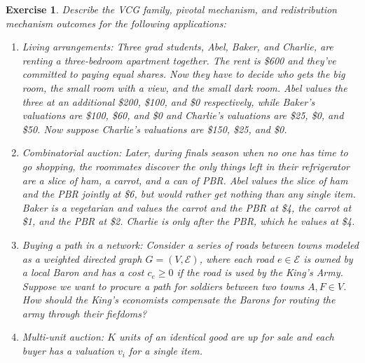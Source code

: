 \documentclass[letter, 10pt]{article}
\theoremstyle{basic}
\newtheorem{exercise}{Exercise}[section]
\begin{document}
\begin{spacing}{1.0}
\begin{exercise}
  Describe the VCG family, pivotal mechanism, and redistribution mechanism
  outcomes for the following applications:
  \begin{enumerate}
  \item Living arrangements: Three grad students, Abel, Baker, and Charlie,
    are renting a three-bedroom apartment together. The rent is \$600 and
    they've committed to paying equal shares. Now they have to decide who
    gets the big room, the small room with a view, and the small dark
    room. Abel values the three at an additional \$200, \$100, and \$0
    respectively, while Baker's valuations are \$100, \$60, and \$0 and Charlie's
    valuations are \$25, \$0, and \$50. Now suppose Charlie's valuations
    are \$150, \$25, and \$0.
  \item Combinatorial auction: Later, during finals season when no one has
    time to go shopping, the roommates discover the only things left in
    their refrigerator are a slice of ham, a carrot, and a can of PBR. Abel
    values the slice of ham and the PBR jointly at \$6, but would rather
    get nothing than any single item. Baker is a vegetarian and values the
    carrot and the PBR at \$4, the carrot at \$1, and the PBR at
    \$2. Charlie is only after the PBR, which he values at \$4.
  \item Buying a path in a network: Consider a series of roads between
    towns modeled as a weighted directed graph $G=(V,\mathcal{E})$, where each road
    $e\in \mathcal{E}$ is owned by a local Baron and has a cost $c_e \geq 0$ if the
    road is used by the King's Army. Suppose we want to procure a path for
    soldiers between two towns $A,F \in V$. How should the King's
    economists compensate the Barons for routing the army through their
    fiefdoms?
    \begin{center}
    \end{center}

  \item Multi-unit auction: $K$ units of an identical good are up for sale
    and each buyer has a valuation $v_i$ for a single item.
  \end{enumerate}
\end{exercise}

\end{spacing}
\end{document}
